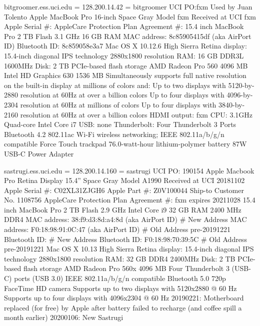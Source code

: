\documentclass[12pt,twoside]{article}
\begin{document}
bitgroomer.ess.uci.edu = 128.200.14.42 = bitgroomer
UCI PO:fxm
Used by Juan Tolento
Apple MacBook Pro 16-inch Space Gray
Model fxm
Received at UCI fxm
Apple Serial \#: 
AppleCare Protection Plan Agreement \#: 
15.4 inch MacBook Pro
2 TB Flash
3.1 GHz
16 GB RAM
MAC address: 8c85905415df (aka AirPort ID)
Bluetooth ID: 8c859058e3a7
Mac OS X 10.12.6 High Sierra
Retina display: 15.4-inch diagonal
IPS technology 2880x1800 resolution
RAM: 16 GB DDR3L 1600MHz
Disk: 2 TB PCIe-based flash storage
AMD Radeon Pro 560 4096 MB Intel HD Graphics 630 1536 MB
Simultaneously supports full native resolution on the built-in display at millions of colors and:
Up to two displays with 5120-by-2880 resolution at 60Hz at over a billion colors
Up to four displays with 4096-by-2304 resolution at 60Hz at millions of colors
Up to four displays with 3840-by-2160 resolution at 60Hz at over a billion colors
HDMI output: fxm
CPU: 3.1GHz Quad-core Intel Core i7
USB: none
Thunderbolt: Four Thunderbolt 3 Ports
Bluetooth 4.2
802.11ac Wi-Fi wireless networking; IEEE 802.11a/b/g/n compatible
Force Touch trackpad
76.0-watt-hour lithium-polymer battery
87W USB-C Power Adapter

sastrugi.ess.uci.edu = 128.200.14.160 = sastrugi
UCI PO: 190154
Apple Macbook Pro Retina Display 15.4'' Space Gray
Model A1990
Received at UCI 20181102
Apple Serial \#: C02XL31ZJGH6
Apple Part \#: Z0V100044
Ship-to Customer No. 1108756
AppleCare Protection Plan Agreement \#: fxm expires 20211028
15.4 inch MacBook Pro
2 TB Flash
2.9 GHz Intel Core i9
32 GB RAM 2400 MHz DDR4
MAC address: 38:f9:d3:8d:a4:8d (aka AirPort ID) # New Address
MAC address: F0:18:98:91:0C:47 (aka AirPort ID) # Old Address pre-20191221
Bluetooth ID:  # New Address
Bluetooth ID: F0:18:98:70:39:5C # Old Address pre-20191221
Mac OS X 10.13 High Sierra
Retina display: 15.4-inch diagonal
IPS technology 2880x1800 resolution
RAM: 32 GB DDR4 2400MHz
Disk: 2 TB PCIe-based flash storage
AMD Radeon Pro 560x 4096 MB
Four Thunderbolt 3 (USB-C) ports (USB 3.0)
IEEE 802.11a/b/g/n compatible
Bluetooth 5.0
720p FaceTime HD camera
Supports up to two displays with 5120x2880 @ 60 Hz 
Supports up to four displays with 4096x2304 @ 60 Hz 
20190221: Motherboard replaced (for free) by Apple after battery failed to recharge (and coffee spill a month earlier)
20200106: New Sastrugi
\end{document}
